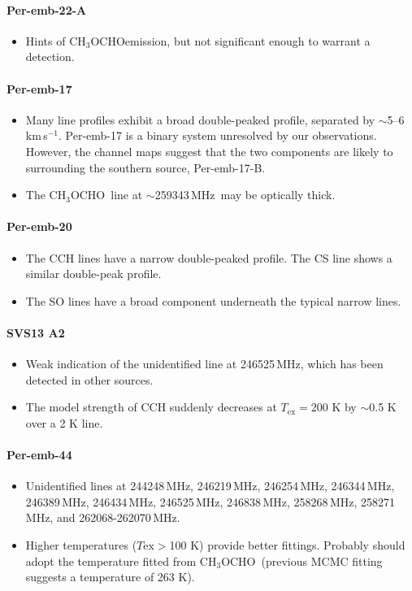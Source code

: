 \documentclass[twocolumn]{aastex62}
\newcommand{\kms}{\mbox{\,km\,s$^{-1}$}}
\newcommand{\mhz}{\mbox{\,MHz}}
\newcommand{\methylformate}{\mbox{CH$_{3}$OCHO}}
\begin{document}
\paragraph{Per-emb-22-A}
\begin{itemize}
  \item Hints of \methylformate emission, but not significant enough to warrant a detection.
\end{itemize}

\paragraph{Per-emb-17}
\begin{itemize}
  \item Many line profiles exhibit a broad double-peaked profile, separated by $\sim$5--6\kms.  Per-emb-17 is a binary system unresolved by our observations.  However, the channel maps suggest that the two components are likely to surrounding the southern source, Per-emb-17-B.
  \item The \methylformate\ line at $\sim$259343\mhz\ may be optically thick.
\end{itemize}

\paragraph{Per-emb-20}
\begin{itemize}
  \item The CCH lines have a narrow double-peaked profile.  The CS line shows a similar double-peak profile.
  \item The SO lines have a broad component underneath the typical narrow lines.
\end{itemize}

\paragraph{SVS13 A2}
\begin{itemize}
  \item Weak indication of the unidentified line at 246525\mhz, which has been detected in other sources.
  \item The model strength of CCH suddenly decreases at $T_\text{ex} = $200 K by $\sim$0.5 K over a 2 K line.
\end{itemize}

\paragraph{Per-emb-44}
\begin{itemize}
  \item Unidentified lines at 244248\mhz, 246219\mhz, 246254\mhz, 246344\mhz, 246389\mhz, 246434\mhz, 246525\mhz, 246838\mhz, 258268\mhz, 258271\mhz, and 262068-262070\mhz.
  \item Higher temperatures ($T\text{ex} > $100 K) provide better fittings.  Probably should adopt the temperature fitted from \methylformate\ (previous MCMC fitting suggests a temperature of 263 K).
\end{itemize}
\end{document}
